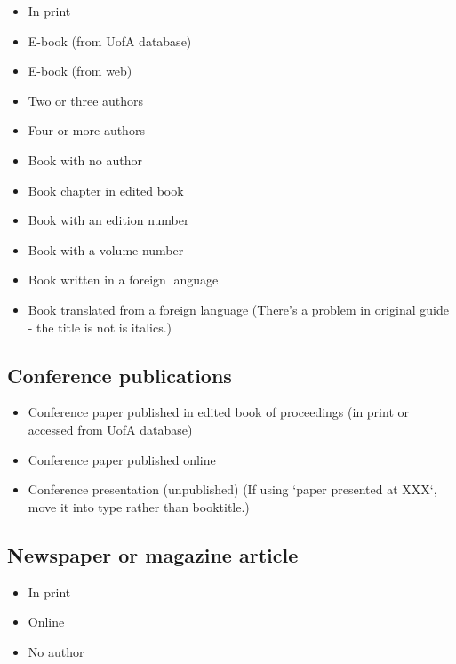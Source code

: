 \documentclass[a4paper]{article}
\begin{document}
\begin{itemize}
    \item \textbf{\citep[p.~\#]{connell2009gender}} In print
    \item \textbf{\citep[p.~\#]{white2020critical}} E-book (from UofA database)
    \item \textbf{\citep[p.~\#]{teresa2015mass}} E-book (from web)
    \item \textbf{\citep[p.~\#]{campbell2010students}} Two or three authors
    \item \textbf{\citep[p.~\#]{henkin2006nuclear}} Four or more authors
    \item \textbf{\citep[p.~\#]{2002style}} Book with no author
    \item \textbf{\citep[p.~\#]{warner2010giving}} Book chapter in edited book
    \item \textbf{\citep[p.~\#]{carroll2012business}} Book with an edition number
    \item \textbf{\citep[p.~\#]{cowie1983oxford}} Book with a volume number
    \item \textbf{\citep[p.~\#]{lemmens2010lagrammaire}} Book written in a foreign language
    \item \textbf{\citep[p.~\#]{jansson1948finn}} Book translated from a foreign language (There's a problem in original guide - the title is not is italics.)
\end{itemize}

\subsection{Conference publications}

\begin{itemize}
    \item \textbf{\citep[p.~\#]{laptev2008learning}} Conference paper published in edited book of proceedings (in print or accessed from UofA database)
    \item \textbf{\citep[p.~\#]{crisp2010assessing}} Conference paper published online
    \item \textbf{\citep[p.~\#]{butler2009using}} Conference presentation (unpublished) (If using `paper presented at XXX`, move it into type rather than booktitle.)
\end{itemize}

\subsection{Newspaper or magazine article}

\begin{itemize}
    \item \textbf{\citep[p.~\#]{robertson2010skating}} In print
    \item \textbf{\citep[p.~\#]{banks2010tweeting}} Online
    \item \textbf{\citep[p.~\#]{evening2014firearms}} No author
\end{itemize}


\end{document}
